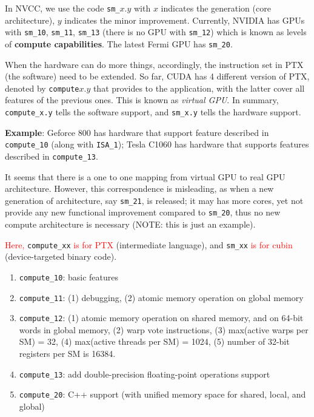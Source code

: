 In NVCC, we use the code \verb!sm_!$x.y$ with $x$ indicates the
generation (core architecture), $y$ indicates the minor
improvement. Currently, NVIDIA has GPUs with \verb!sm_10!,
\verb!sm_11!, \verb!sm_13! (there is no GPU with \verb!sm_12!) which
is known as levels of {\bf compute capabilities}. The latest Fermi GPU
has \verb!sm_20!.

When the hardware can do more things, accordingly, the instruction set
in PTX (the software) need to be extended.  So far, CUDA has 4
different version of PTX, denoted by \verb!compute!$x.y$ that provides
to the application, with the latter cover all features of the previous
ones. This is known as {\it virtual GPU}.
In summary, \verb!compute_x.y! tells the software support, and
\verb!sm_x.y! tells the hardware support.  

{\bf Example}: Geforce 800 has hardware that support feature described
in \verb!compute_10!  (along with \verb!ISA_1!); Tesla C1060 has
hardware that supports features described in
\verb!compute_13!. %

It seems that there is a one to one mapping from virtual GPU to real
GPU architecture.  However, this correspondence is misleading, as when
a new generation of architecture, say \verb!sm_21!, is released; it
may has more cores, yet not provide any new functional improvement
compared to \verb!sm_20!, thus no new compute architecture is
necessary (NOTE: this is just an example).

\begin{framed}
  
  \textcolor{red}{Here,} \verb!compute_xx!  \textcolor{red}{is for PTX}
  (intermediate language), and \verb!sm_xx!
  \textcolor{red}{is for cubin} (device-targeted binary code).
  \begin{enumerate}
  \item \verb!compute_10!: basic features
  \item \verb!compute_11!: (1) debugging, (2) atomic memory operation on
    global memory
  \item \verb!compute_12!: (1) atomic memory operation on shared memory, and on
  64-bit words in global memory, (2) warp vote instructions, (3) max(active
  warps per SM) = 32, (4) max(active threads per SM) = 1024, (5) number of
  32-bit registers per SM is 16384.
  \item \verb!compute_13!: add double-precision floating-point operations
  support
  \item \verb!compute_20!: C++ support (with unified memory space for
    shared, local, and global)
  \end{enumerate}
\end{framed}

